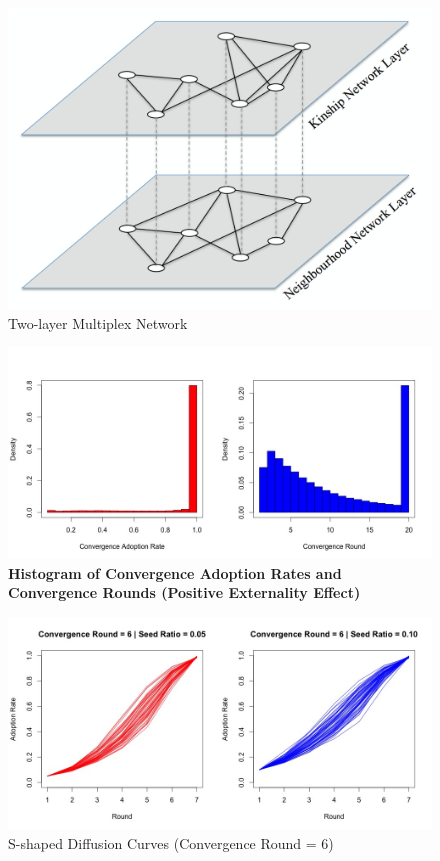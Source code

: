 \documentclass{bmcart}
\begin{document}
\begin{backmatter}
\begin{figure}[h!]
\centering
\includegraphics[scale=0.25]{two-layer_network.jpg}
\caption{Two-layer Multiplex Network}
\label{Fig: two-layer network}
\end{figure}

\begin{figure}[h!]
\centering
\includegraphics[scale=0.35]{Hist_conv_adp_and_round_pos.jpg}
\caption{\textbf{Histogram of Convergence Adoption Rates and Convergence Rounds (Positive Externality Effect)}}
\label{Fig: hist conv adp and round pos}
\end{figure}

\begin{figure}[h!]
\centering
\includegraphics[scale=0.35]{S-shape_curves_round_6_pos.jpg}
\caption{S-shaped Diffusion Curves (Convergence Round = 6)}
\label{Fig: s-shaped curves round=6}
\end{figure}


\end{backmatter}
\end{document}
